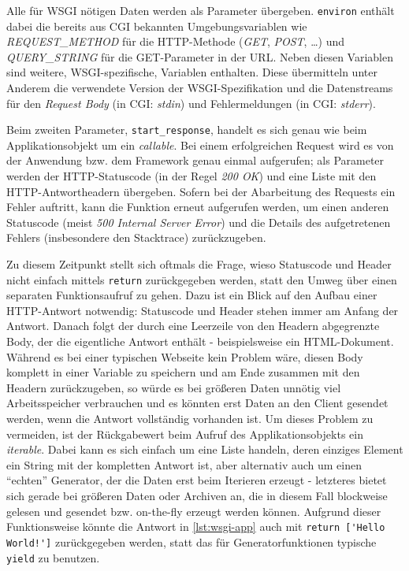 Alle für WSGI nötigen Daten werden als Parameter übergeben. \lstinline{environ} enthält dabei die
bereits aus CGI bekannten Umgebungsvariablen wie \emph{REQUEST\_METHOD} für die HTTP-Methode
(\emph{GET}, \emph{POST}, \ldots) und \emph{QUERY\_STRING} für die GET-Parameter in der URL. Neben
diesen Variablen sind weitere, WSGI-spezifische, Variablen enthalten. Diese übermitteln unter
Anderem die verwendete Version der WSGI-Spezifikation und die Datenstreams für den
\emph{Request Body} (in CGI: \emph{stdin}) und Fehlermeldungen (in CGI: \emph{stderr}).

Beim zweiten Parameter, \lstinline{start_response}, handelt es sich genau wie beim
Applikationsobjekt um ein \emph{callable}. Bei einem erfolgreichen Request wird es von der Anwendung
bzw. dem Framework genau einmal aufgerufen; als Parameter werden der HTTP-Statuscode (in der
Regel \emph{200 OK}) und eine Liste mit den HTTP-Antwortheadern übergeben. Sofern bei der
Abarbeitung des Requests ein Fehler auftritt, kann die Funktion erneut aufgerufen werden, um einen
anderen Statuscode (meist \emph{500 Internal Server Error}) und die Details des aufgetretenen
Fehlers (insbesondere den Stacktrace) zurückzugeben.

Zu diesem Zeitpunkt stellt sich oftmals die Frage, wieso Statuscode und Header nicht einfach mittels
\lstinline{return} zurückgegeben werden, statt den Umweg über einen separaten Funktionsaufruf zu
gehen. Dazu ist ein Blick auf den Aufbau einer HTTP-Antwort notwendig: Statuscode und Header stehen
immer am Anfang der Antwort. Danach folgt der durch eine Leerzeile von den Headern abgegrenzte Body,
der die eigentliche Antwort enthält - beispielsweise ein HTML-Dokument. Während es bei einer
typischen Webseite kein Problem wäre, diesen Body komplett in einer Variable zu speichern und am
Ende zusammen mit den Headern zurückzugeben, so würde es bei größeren Daten unnötig viel
Arbeitsspeicher verbrauchen und es könnten erst Daten an den Client gesendet werden, wenn die
Antwort vollständig vorhanden ist. Um dieses Problem zu vermeiden, ist der Rückgabewert beim Aufruf
des Applikationsobjekts ein \emph{iterable}. Dabei kann es sich einfach um eine Liste handeln, deren
einziges Element ein String mit der kompletten Antwort ist, aber alternativ auch um einen
\enquote{echten} Generator, der die Daten erst beim Iterieren erzeugt - letzteres bietet sich gerade
bei größeren Daten oder Archiven an, die in diesem Fall blockweise gelesen und gesendet bzw.
on-the-fly erzeugt werden können. Aufgrund dieser Funktionsweise könnte die Antwort in
\autoref{lst:wsgi-app} auch mit \lstinline{return ['Hello World!']} zurückgegeben werden, statt das
für Generatorfunktionen typische \lstinline{yield} zu benutzen.


